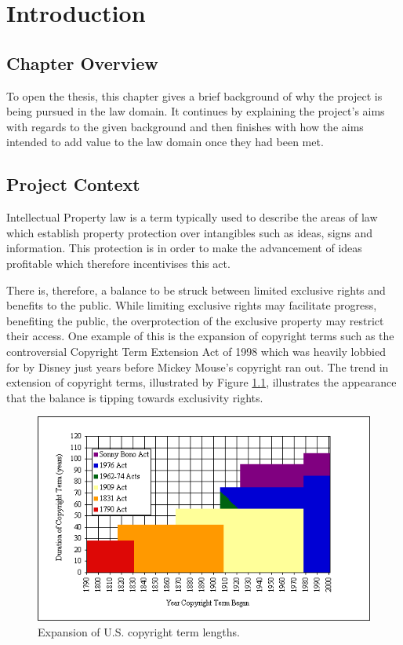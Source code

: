 \chapter{Introduction}
	\section{Chapter Overview}
		To open the thesis, this chapter gives a brief background of why the project is being pursued in the law domain. It continues by explaining the project’s aims with regards to the given background and then finishes with how the aims intended to add value to the law domain once they had been met. 
	\section{Project Context}
		Intellectual Property law is a term typically used to describe the areas of law which establish property protection over intangibles such as ideas, signs and information. This protection is in order to make the advancement of ideas profitable which therefore incentivises this act\cite{ip_edu_bently}.
			
		There is, therefore, a balance to be struck between limited exclusive rights and benefits to the public. While limiting exclusive rights may facilitate progress, benefiting the public, the overprotection of the exclusive property may restrict their access\cite{handbook_ip_hr_geiger}. One example of this is the expansion of copyright terms such as the controversial Copyright Term Extension Act of 1998 which was heavily lobbied for by Disney just years before Mickey Mouse's copyright ran out\cite{mickey_mouse_grzelak}. The trend in extension of copyright terms, illustrated by Figure \ref{fig:ext_us_cop}, illustrates the appearance that the balance is tipping towards exclusivity rights. 

		\begin{figure}[h]
    		\centering
    		\includegraphics[width=0.5\linewidth]{resources/images/extention_of_us_copyright.png}
    		\caption{Expansion of U.S. copyright term lengths\cite{copyright_term_length_graph_bell}.}
    		\label{fig:ext_us_cop}
		\end{figure}
			
